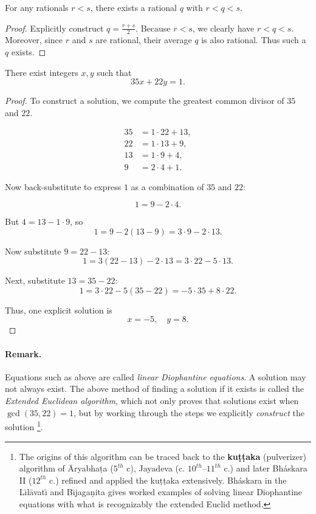 \begin{theorem}
For any rationals $r<s$, there exists a rational $q$ with $r<q<s$.
\end{theorem}
\begin{proof}
Explicitly construct $q=\tfrac{r+s}{2}$. Because $r<s$, we clearly have
$r<q<s$. Moreover, since $r$ and $s$ are rational, their average $q$ is also
rational. Thus such a $q$ exists.
\end{proof}

\begin{theorem}
\label{thm:diaphontine}
There exist integers $x,y$ such that
\[
35x + 22y = 1.
\]
\end{theorem}

\begin{proof}
To construct a solution, we compute the greatest common divisor of $35$ and $22$.

\begin{align*}
35 &= 1\cdot 22 + 13, \\
22 &= 1\cdot 13 + 9, \\
13 &= 1\cdot 9 + 4, \\
9 &= 2\cdot 4 + 1.
\end{align*}

Now back-substitute to express $1$ as a combination of $35$ and $22$:

\[
1 = 9 - 2\cdot 4.
\]

But $4 = 13 - 1\cdot 9$, so
\[
1 = 9 - 2(13-9) = 3\cdot 9 - 2\cdot 13.
\]

Now substitute $9 = 22 - 13$:
\[
1 = 3(22-13) - 2\cdot 13 = 3\cdot 22 - 5\cdot 13.
\]

Next, substitute $13 = 35 - 22$:
\[
1 = 3\cdot 22 - 5(35-22) = -5\cdot 35 + 8\cdot 22.
\]

Thus, one explicit solution is
\[
x=-5,\quad y=8.
\]
\end{proof}

\paragraph{Remark.}
Equations such as above are called {\em linear Diophantine equations}. A solution may not always exist. The above method of finding a solution if it exists  is called the {\em Extended Euclidean algorithm}, which not only proves that solutions exist when 
$\gcd(35,22)=1$, but by working through the steps we explicitly \emph{construct}
the solution \footnote{The origins of this algorithm can be traced back to the {\bf ku\d{t}\d{t}aka} (pulverizer) algorithm of \={A}ryabha\d{t}a ($5^{th}$ c), Jayadeva (c. $10^{th}$–$11^{th}$ c.) and later Bh\'{a}skara II ($12^{th}$ c.) refined and applied the ku\d{t}\d{t}aka extensively. Bh\'{a}skara in the L\={\i}l\={a}vat\={\i} and B\={\i}jaga\d{n}ita gives worked examples of solving linear Diophantine equations with what is recognizably the extended Euclid method.}.


